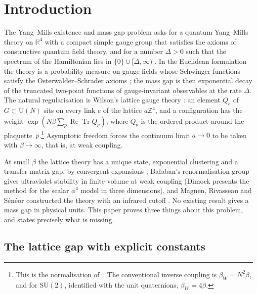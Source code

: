 \documentclass[11pt]{amsart}
\theoremstyle{definition}
\theoremstyle{remark}
\numberwithin{equation}{section}
\newcommand{\R}{\mathbb{R}}
\newcommand{\Z}{\mathbb{Z}}
\newcommand{\SU}{\mathrm{SU}}
\newcommand{\U}{\mathrm{U}}
\newcommand{\ReTr}{\operatorname{Re}\operatorname{Tr}}
\begin{document}
\maketitle
{}

\section{Introduction}\label{sec:intro}

The Yang--Mills existence and mass gap problem asks for a quantum
Yang--Mills theory on $\R^4$ with a compact simple gauge group that satisfies
the axioms of constructive quantum field theory, and for a number $\Delta>0$
such that the spectrum of the Hamiltonian lies in $\{0\}\cup[\Delta,\infty)$
\cite{JW06}. In the Euclidean formulation the theory is a probability measure
on gauge fields whose Schwinger functions satisfy the Osterwalder--Schrader
axioms \cite{OS73,OS75}; the mass gap is then exponential decay of the
truncated two-point functions of gauge-invariant observables at the rate
$\Delta$. The natural regularisation is Wilson's lattice gauge theory
\cite{Wil74}: an element $Q_e$ of $G\subset\U(N)$ sits on every link $e$ of the
lattice $a\Z^4$, and a configuration has the weight
$\exp(N\beta\sum_p\ReTr Q_p)$, where $Q_p$ is the ordered product around the
plaquette~$p$.\footnote{This is the normalisation of~\cite{SZZ23,BB26a}. The
conventional inverse coupling is $\beta_W=N^2\beta$, and for $\SU(2)$,
identified with the unit quaternions, $\beta_W=4\beta$.} Asymptotic freedom
forces the continuum limit $a\to0$ to be taken with $\beta\to\infty$, that is,
at weak coupling.

At small $\beta$ the lattice theory has a unique state, exponential clustering
and a transfer-matrix gap, by convergent expansions \cite{OSei78,Sei82};
Ba{\l}aban's renormalisation group \cite{Bal84a,Bal85a,Bal89b} gives ultraviolet
stability in finite volume at weak coupling (Dimock \cite{Dim13} presents the
method for the scalar $\phi^4$ model in three dimensions), and Magnen, Rivasseau and S\'en\'eor constructed the theory with an
infrared cutoff \cite{MRS93}. No existing result gives a mass gap in physical
units. This paper proves three things about this problem, and states
precisely what is missing.

\subsection{The lattice gap with explicit constants}
\end{document}
